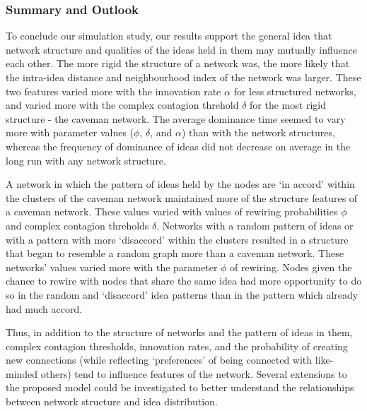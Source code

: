 \documentclass{beamer}
\begin{document}
\begin{frame}
\frametitle{Summary and Outlook}
To conclude our simulation study, our results support the general idea that network structure and qualities of the ideas held in them may mutually influence each other. The more rigid the structure of a network was, the more likely that the intra-idea distance and neighbourhood index of the network was larger. These two features varied more with the innovation rate $\alpha$ for less structured networks, and varied more with the complex contagion threhold $\delta$ for the most rigid structure - the caveman network. The average dominance time seemed to vary more with parameter values ($\phi$, $\delta$, and $\alpha$) than with the network structures, whereas the frequency of dominance of ideas did not decrease on average in the long run with any network structure.

A network in which the pattern of ideas held by the nodes are `in accord' within the clusters of the caveman network maintained more of the structure features of a caveman network. These values varied with values of rewiring probabilities $\phi$ and complex contagion threholds $\delta$. Networks with a random pattern of ideas or with a pattern with more `disaccord' within the clusters resulted in a structure that began to resemble a random graph more than a caveman network. These networks' values varied more with the parameter $\phi$ of rewiring. Nodes given the chance to rewire with nodes that share the same idea had more opportunity to do so in the random and `disaccord' idea patterns than in the pattern which already had much accord.

Thus, in addition to the structure of networks and the pattern of ideas in them, complex contagion thresholds, innovation rates, and the probability of creating new connections (while reflecting `preferences' of being connected with like-minded others) tend to influence features of the network. Several extensions to the proposed model could be investigated to better understand the relationships between network structure and idea distribution.
\end{frame}
%
\end{document}
